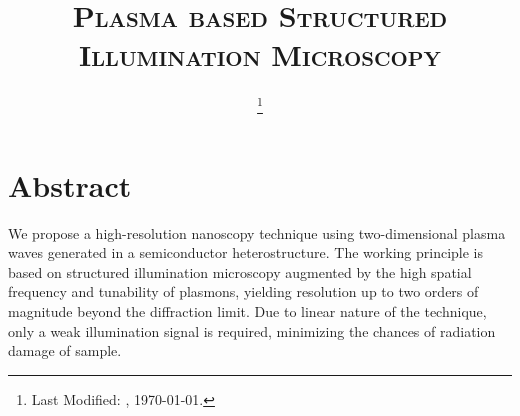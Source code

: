 \documentclass[11pt]{article}
\begin{document}
\title{\textsc{Plasma based Structured Illumination Microscopy}}
\date{\footnote{Last Modified: \currenttime, \today.}}

\maketitle


\section{Abstract}
%
We propose a high-resolution nanoscopy technique using two-dimensional plasma waves generated in a semiconductor heterostructure. The working principle is based on structured illumination microscopy augmented by the high spatial frequency and tunability of plasmons, yielding resolution up to two orders of magnitude beyond the diffraction limit. Due to linear nature of the technique, only a weak illumination signal is required, minimizing the chances of radiation damage of sample.
%
\end{document}
